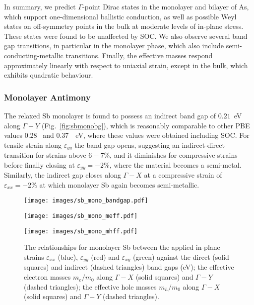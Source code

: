 In summary, 
we predict  
$\Gamma$-point Dirac {states} 
in the monolayer and  bilayer of As, 
{which support one-dimensional ballistic conduction}, 
as well as possible 
Weyl {states} 
on off-symmetry points in the bulk 
at moderate levels of in-plane stress.
%
These states were found to be 
unaffected by SOC.
%
We also observe several 
band gap transitions, 
in particular in the monolayer phase, 
which also include 
semi-conducting-metallic transitions.
%
Finally, the effective masses 
respond approximately linearly 
with respect to uniaxial strain, 
except in the bulk,
which exhibits quadratic behaviour.



\subsubsection{Monolayer Antimony}

The relaxed Sb monolayer  
is found to possess 
an indirect band gap of $0.21$~eV 
along $\Gamma-Y$ (Fig.~\ref{fig:sbmonobg}), 
which is reasonably comparable to other 
PBE values 
0.28~\cite{doi:10.1021/acsami.5b02441} 
and 0.37~\cite{PhysRevB.91.235446}~eV, 
where these values 
were obtained including SOC.
%
For tensile strain along $\varepsilon_{yy}$
the band gap opens, 
suggesting an indirect-direct 
transition for strains above $6-7\%$,  
and it diminishes for compressive strains 
before finally closing at $\varepsilon_{yy}=-2\%$, 
where the material becomes a semi-metal.
%
Similarly, the indirect gap closes along $\Gamma-X$ 
at a compressive strain of 
$\varepsilon_{xx}=-2\%$ 
 at which monolayer Sb 
 again becomes semi-metallic.

\begin{figure}[th!]
\begin{subfloat}{
\texttt{[image: images/sb\_mono\_bandgap.pdf]}
  \label{fig:sbmonobg}}
\end{subfloat}
%
\begin{subfloat}[Monolayer Sb $m_e/m_0$]{
\texttt{[image: images/sb\_mono\_meff.pdf]}
  \label{fig:sbmonomeff}}
\end{subfloat}
%
\begin{subfloat}[Monolayer Sb $m_h/m_0$]{
\texttt{[image: images/sb\_mono\_mhff.pdf]}
  \label{fig:sbmonomhff}}
\end{subfloat}
%
\caption[Electronic properties of monolayer antimony for in-plane strains]
{The relationships for monolayer Sb between 
the applied in-plane strains $\varepsilon_{xx}$ (blue),
$\varepsilon_{yy}$ (red) and $\varepsilon_{xy}$ (green) against 
%
\protect{} 
the direct (solid  squares) and indirect 
(dashed triangles) band gaps (eV);
%
\protect{}  
the effective electron masses $m_e/m_0$ 
along $\Gamma-X$ (solid squares) and 
$\Gamma-Y$ (dashed triangles);
%
\protect{} 
the effective hole masses $m_h/m_0$ 
along $\Gamma-X$ (solid squares) and 
$\Gamma-Y$ (dashed triangles).}
\label{fig:sb_mono_elec_properties}
\end{figure}


